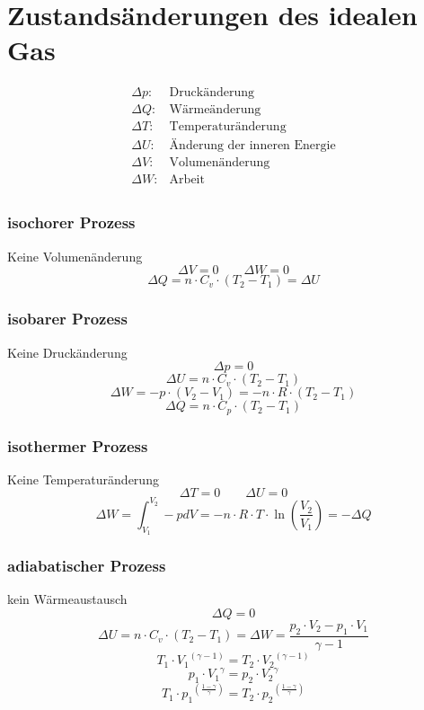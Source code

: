 \section{Zustandsänderungen des idealen Gas}
\[  \begin{array}{ll} 
\Delta p: & \text{Druckänderung} \\
\Delta Q: & \text{Wärmeänderung} \\
\Delta T: & \text{Temperaturänderung} \\
\Delta U: & \text{Änderung der inneren Energie} \\
\Delta V: & \text{Volumenänderung} \\
\Delta W: & \text{Arbeit} \\
\end{array} \]

\subsubsection{isochorer Prozess}
Keine Volumenänderung
\[ \boxed{\Delta V = 0} \qquad \boxed{\Delta W = 0} \]
\[ \boxed{\Delta Q = n \cdot C_v \cdot (T_2 - T_1) = \Delta U} \]

\subsubsection{isobarer Prozess}
Keine Druckänderung
\[ \boxed{\Delta p = 0} \]
\[ \boxed{\Delta U = n \cdot C_v \cdot (T_2 - T_1)} \]
\[ \boxed{\Delta W = - p \cdot (V_2 - V_1) = - n \cdot R \cdot (T_2 - T_1)} \]
\[ \boxed{\Delta Q = n \cdot C_p \cdot (T_2 - T_1)} \]

\subsubsection{isothermer Prozess}
Keine Temperaturänderung
\[ \boxed{\Delta T = 0} \qquad \boxed{\Delta U = 0} \]
\[ \boxed{\Delta W = \int_{V_1}^{V_2} - p dV = - n \cdot R \cdot T \cdot 
\ln\left(\frac{V_2}{V_1}\right) = - \Delta Q} \]

\subsubsection{adiabatischer Prozess}
kein Wärmeaustausch
\[ \boxed{\Delta Q = 0} \]
\[ \boxed{\Delta U = n \cdot C_v \cdot (T_2 - T_1) = \Delta W
= \frac{p_2 \cdot V_2 - p_1 \cdot V_1}{\gamma - 1}} \]
\[ \boxed{T_1 \cdot {V_1}^{(\gamma - 1)} = T_2 \cdot {V_2}^{(\gamma - 1)}} \]
\[ \boxed{p_1 \cdot {V_1}^{\gamma} = p_2 \cdot {V_2}^{\gamma}} \]
\[ \boxed{T_1 \cdot {p_1}^{\left(\frac{1 - \gamma}{\gamma}\right)} 
= T_2 \cdot {p_2}^{\left(\frac{1 - \gamma}{\gamma}\right)}} \]

